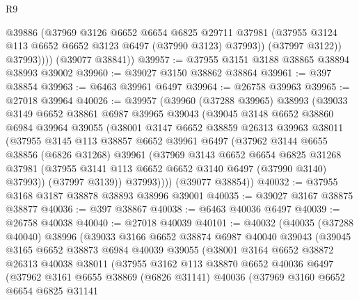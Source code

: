 \begin{lexlean}{R9}
\begin{coremodule}
                @39886
                (@37969
                  @3126
                  @6652
                  @6654
                  @6825
                  @29711
                  @37981
                  (@37955 @3124 @113 @6652 @6652 @3123 @6497 (@37990 @3123) @37993))
                (@37997 @3122))
              @37993))))
      (@39077 @38841))
@39957 := @37955 @3151 @3188 @38865 @38894 @38993 @39002
@39960 := @39027 @3150 @38862 @38864
@39961 := @397 @38854
@39963 := @6463 @39961 @6497
@39964 := @26758 @39963
@39965 := @27018 @39964
@40026 := @39957
    (@39960
      (@37288 @39965)
      @38993
      (@39033
        @3149
        @6652
        @38861
        @6987
        @39965
        @39043
        (@39045
          @3148
          @6652
          @38860
          @6984
          @39964
          @39055
          (@38001
            @3147
            @6652
            @38859
            @26313
            @39963
            @38011
            (@37955
              @3145
              @113
              @38857
              @6652
              @39961
              @6497
              (@37962
                @3144
                @6655
                @38856
                (@6826 @31268)
                @39961
                (@37969
                  @3143
                  @6652
                  @6654
                  @6825
                  @31268
                  @37981
                  (@37955 @3141 @113 @6652 @6652 @3140 @6497 (@37990 @3140) @37993))
                (@37997 @3139))
              @37993))))
      (@39077 @38854))
@40032 := @37955 @3168 @3187 @38878 @38893 @38996 @39001
@40035 := @39027 @3167 @38875 @38877
@40036 := @397 @38867
@40038 := @6463 @40036 @6497
@40039 := @26758 @40038
@40040 := @27018 @40039
@40101 := @40032
    (@40035
      (@37288 @40040)
      @38996
      (@39033
        @3166
        @6652
        @38874
        @6987
        @40040
        @39043
        (@39045
          @3165
          @6652
          @38873
          @6984
          @40039
          @39055
          (@38001
            @3164
            @6652
            @38872
            @26313
            @40038
            @38011
            (@37955
              @3162
              @113
              @38870
              @6652
              @40036
              @6497
              (@37962
                @3161
                @6655
                @38869
                (@6826 @31141)
                @40036
                (@37969
                  @3160
                  @6652
                  @6654
                  @6825
                  @31141

\end{coremodule}
\end{lexlean}
